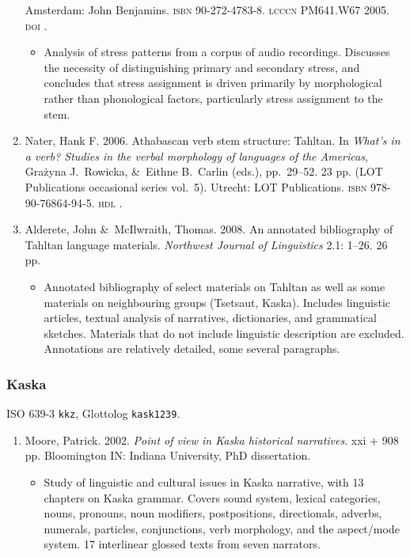 \documentclass[12pt,letterpaper,oneside,article]{memoir}
\begin{document}
\begin{enumerate}
	Amsterdam: John Benjamins.
	\textsc{isbn} 90-272-4783-8.
	\textsc{lcccn} PM641.W67 2005.
	\textsc{doi} .
	\begin{itemize}
	\item	Analysis of stress patterns from a corpus of audio recordings.
		Discusses the necessity of distinguishing primary and secondary stress,
		and concludes that stress assignment is driven primarily by morphological
		rather than phonological factors, particularly stress assignment to the stem.
	\end{itemize}
\item	Nater, Hank F.
	2006.
	Athabascan verb stem structure: Tahltan.
	In \textit{What’s in a verb? Studies in the verbal morphology of languages of
		the Americas},
	Grażyna J.\ Rowicka, \&\ Eithne B.\ Carlin (eds.), pp.\ 29–52.
	23 pp.
	(LOT Publications occasional series vol.\ 5).
	Utrecht: LOT Publications.
	\textsc{isbn} 978-90-76864-94-5.
	\textsc{hdl} .
\item	Alderete, John \&\ McIlwraith, Thomas.
	2008.
	An annotated bibliography of Tahltan language materials.
	\textit{Northwest Journal of Linguistics} 2.1: 1–26.
	26 pp.
	\begin{itemize}
	\item	Annotated bibliography of select materials on Tahltan as well as
		some materials on neighbouring groups (Tsetsaut, Kaska).
		Includes linguistic articles, textual analysis of narratives,
		dictionaries, and grammatical sketches.
		Materials that do not include linguistic description are excluded.
		Annotations are relatively detailed, some several paragraphs.
	\end{itemize}
\end{enumerate}

\subsubsection{Kaska}\label{sec:kaska}

ISO 639-3 \texttt{kkz}, Glottolog \texttt{kask1239}.

\begin{enumerate}
\item	Moore, Patrick.
	2002.
	\textit{Point of view in Kaska historical narratives}.
	xxi + 908 pp.
	Bloomington IN: Indiana University, PhD dissertation.
	\begin{itemize}
	\item	Study of linguistic and cultural issues in Kaska narrative,
		with 13 chapters on Kaska grammar.
		Covers sound system, lexical categories, nouns, pronouns, noun modifiers,
		postpositions, directionals, adverbs, numerals, particles, conjunctions,
		verb morphology, and the aspect/mode system.
		17 interlinear glossed texts from seven narrators.
	\end{itemize}
\end{enumerate}
\end{document}
